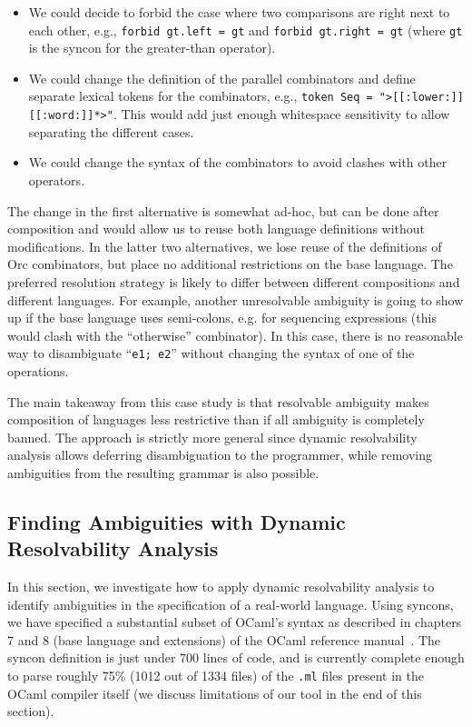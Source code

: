\documentclass[runningheads]{llncs}
\newcommand{\ocaml}{\lstinline[language={[objective]caml}]}
\newcommand{\syncon}{\lstinline[language=syncon]}
\begin{document}
\begin{itemize}
\item We could decide to forbid the case where two comparisons are
  right next to each other, e.g., \syncon{forbid gt.left = gt} and
  \syncon{forbid gt.right = gt} (where \syncon{gt} is the syncon
  for the greater-than operator).
\item We could change the definition of the parallel combinators
  and define separate lexical tokens for the combinators, e.g.,
  \syncon{token Seq = ">[[:lower:]][[:word:]]*>"}. This would add
  just enough whitespace sensitivity to allow separating the
  different cases.
\item We could change the syntax of the combinators to avoid
  clashes with other operators.
\end{itemize}

\noindent
The change in the first alternative is somewhat ad-hoc, but can be done after composition
and would allow us to reuse both language definitions without
modifications. In the latter two alternatives, we lose reuse of
the definitions of Orc combinators, but place no additional
restrictions on the base language. The preferred resolution
strategy is likely to differ between different compositions and
different languages.
%
For example, another unresolvable ambiguity is going to show up if
the base language uses semi-colons, e.g. for sequencing
expressions (this would clash with the ``otherwise'' combinator).
In this case, there is no reasonable way to disambiguate
``\ocaml{e1; e2}'' without changing the syntax of one of the
operations.

The main takeaway from this case study is that resolvable
ambiguity makes composition of languages less restrictive than if
all ambiguity is completely banned. The approach is strictly more
general since dynamic resolvability analysis allows deferring
disambiguation to the programmer, while removing ambiguities from
the resulting grammar is also possible.


\subsection{Finding Ambiguities with Dynamic Resolvability Analysis} \label{sec:evaluation-ocaml}

In this section, we investigate how to apply dynamic resolvability
analysis to identify ambiguities in the specification of a
real-world language.
%
Using syncons, we have specified a substantial subset of OCaml's
syntax as described in chapters 7 and 8 (base language and
extensions) of the OCaml reference manual~\cite{leroyOCamlSystemRelease2018}.
The syncon definition is just under 700 lines of code, and is
currently complete enough to parse roughly 75\% (1012 out of 1334
files) of the \verb|.ml| files present in the OCaml compiler
itself (we discuss limitations of our tool in the end of this
section).
\end{document}
